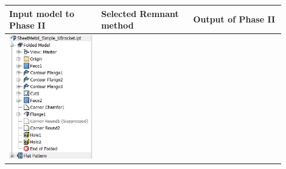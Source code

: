 \begin{minipage}[t]{\linewidth}
\begin{tabular}[h]{@{} p{0.3\linewidth} p{0.3\linewidth}  p{0.3\linewidth}@{}} \toprule

\textbf{Input model to Phase II} & \textbf{Selected Remnant method} & \textbf{Output of Phase II} \\ \midrule

\includegraphics[width=0.92\linewidth]{..//Common/images/DefeatPhase_II_t1} &

\end{tabular}
\end{minipage}

